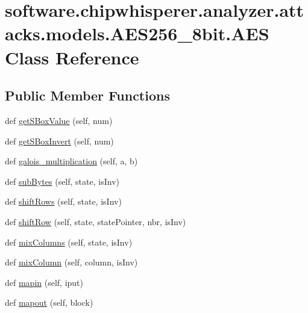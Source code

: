 \hypertarget{classsoftware_1_1chipwhisperer_1_1analyzer_1_1attacks_1_1models_1_1AES256__8bit_1_1AES}{}\section{software.\+chipwhisperer.\+analyzer.\+attacks.\+models.\+A\+E\+S256\+\_\+8bit.\+A\+E\+S Class Reference}
\label{classsoftware_1_1chipwhisperer_1_1analyzer_1_1attacks_1_1models_1_1AES256__8bit_1_1AES}
\subsection*{Public Member Functions}
\begin{DoxyCompactItemize}
\item 
def \hyperlink{classsoftware_1_1chipwhisperer_1_1analyzer_1_1attacks_1_1models_1_1AES256__8bit_1_1AES_ab4ebe558a658ffc5280e8c35c774df96}{get\+S\+Box\+Value} (self, num)
\item 
def \hyperlink{classsoftware_1_1chipwhisperer_1_1analyzer_1_1attacks_1_1models_1_1AES256__8bit_1_1AES_a693835484cef99fc3629f028cb243d10}{get\+S\+Box\+Invert} (self, num)
\item 
def \hyperlink{classsoftware_1_1chipwhisperer_1_1analyzer_1_1attacks_1_1models_1_1AES256__8bit_1_1AES_a2eeb2ffeed81b39fcee858f9dc7ccbca}{galois\+\_\+multiplication} (self, a, b)
\item 
def \hyperlink{classsoftware_1_1chipwhisperer_1_1analyzer_1_1attacks_1_1models_1_1AES256__8bit_1_1AES_a1c5ee9303e72ff765a98827ba6d80259}{sub\+Bytes} (self, state, is\+Inv)
\item 
def \hyperlink{classsoftware_1_1chipwhisperer_1_1analyzer_1_1attacks_1_1models_1_1AES256__8bit_1_1AES_a8fc34159e33b16bc614399d208c3cb52}{shift\+Rows} (self, state, is\+Inv)
\item 
def \hyperlink{classsoftware_1_1chipwhisperer_1_1analyzer_1_1attacks_1_1models_1_1AES256__8bit_1_1AES_ac0de1586dfed65815fc7c17c19334a10}{shift\+Row} (self, state, state\+Pointer, nbr, is\+Inv)
\item 
def \hyperlink{classsoftware_1_1chipwhisperer_1_1analyzer_1_1attacks_1_1models_1_1AES256__8bit_1_1AES_a470e2855d1f41f226ae297c841d9b1ca}{mix\+Columns} (self, state, is\+Inv)
\item 
def \hyperlink{classsoftware_1_1chipwhisperer_1_1analyzer_1_1attacks_1_1models_1_1AES256__8bit_1_1AES_aab4240bdf8c39858424f05c1fd88f6f5}{mix\+Column} (self, column, is\+Inv)
\item 
def \hyperlink{classsoftware_1_1chipwhisperer_1_1analyzer_1_1attacks_1_1models_1_1AES256__8bit_1_1AES_a49998c31b3e402d7f6bd986cc048c01b}{mapin} (self, iput)
\item 
def \hyperlink{classsoftware_1_1chipwhisperer_1_1analyzer_1_1attacks_1_1models_1_1AES256__8bit_1_1AES_a1903875c578525032442e5e07e0b3acf}{mapout} (self, block)
\end{DoxyCompactItemize}
